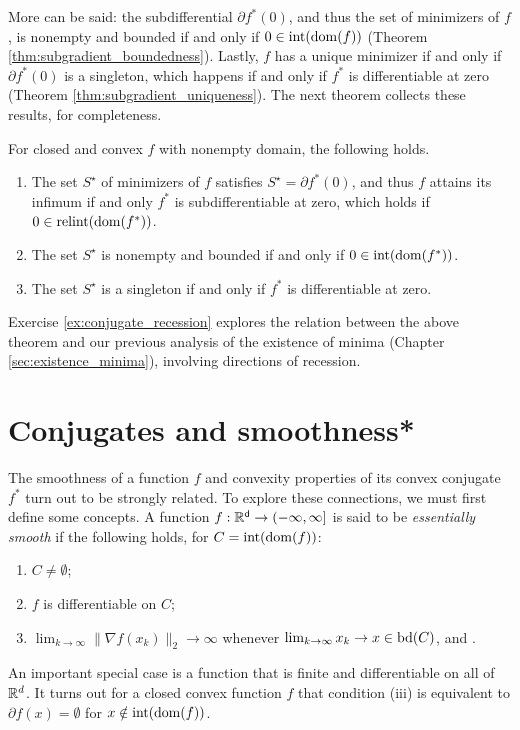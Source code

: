 More can be said: the subdifferential $\partial f^*(0)$, and thus the set of
minimizers of $f$, is nonempty and bounded if and only if $0 \in
\operatorname{int}(\operatorname{dom}(f))$ (Theorem \ref{thm:subgradient_boundedness}). Lastly, $f$ has
a unique minimizer if and only if $\partial f^*(0)$ is a singleton, which
happens if and only if $f^*$ is differentiable at zero (Theorem
\ref{thm:subgradient_uniqueness}). The next theorem collects these results, for
completeness.

\begin{Theorem}
For closed and convex $f$ with nonempty domain, the following holds.

\begin{enumerate}[label=(\roman*)]
\label{thm:conjugate_minima} 
\item The set $S^\star$ of minimizers of $f$ satisfies $S^\star = \partial
  f^*(0)$, and thus $f$ attains its infimum if and only $f^*$ is
  subdifferentiable at zero, which holds if $0 \in \operatorname{relint}(\operatorname{dom}(f^*))$.    

\item The set $S^\star$ is nonempty and bounded if and only if $0 \in
  \operatorname{int}(\operatorname{dom}(f^*))$.   

\item The set $S^\star$ is a singleton if and only if $f^*$ is differentiable
  at zero. 
\end{enumerate}
\end{Theorem}
 
Exercise \ref{ex:conjugate_recession} explores the relation between the above
theorem and our previous analysis of the existence of minima (Chapter
\ref{sec:existence_minima}), involving directions of recession.   

\section{Conjugates and smoothness*}
\label{sec:conjugate_smoothness}

The smoothness of a function $f$ and convexity properties of its convex
conjugate $f^*$ turn out to be strongly related. To explore these connections,
we must first define some concepts. A function $f : \mathbb{R}^{\mathsf{d}} \to (-\infty,\infty]$
is said to be \emph{essentially smooth} if the following holds, for $C =
\operatorname{int}(\operatorname{dom}(f))$:     
\begin{enumerate}[label=(\roman*)]
\item $C \not= \emptyset$;
\item $f$ is differentiable on $C$;
\item $\lim_{k \to \infty} \|\nabla f(x_k)\|_2 \to \infty$ whenever $\lim_{k \to
    \infty} x_k \to x \in \operatorname{bd}(C)$, and . 
\end{enumerate}
An important special case is a function that is finite and differentiable on all
of $\mathbb{R}^d$. It turns out for a closed convex function $f$ that condition (iii)
is equivalent to $\partial f(x) = \emptyset$ for $x \notin \operatorname{int}(\operatorname{dom}(f))$.   


